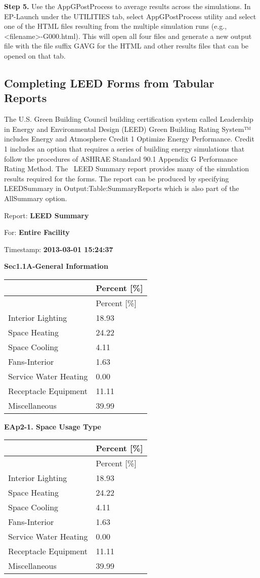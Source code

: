 \textbf{Step 5.} Use the AppGPostProcess to average results across the simulations. In EP-Launch under the UTILITIES tab, select AppGPostProcess utility and select one of the HTML files resulting from the multiple simulation runs (e.g., \textless{}filename\textgreater{}-G000.html). This will open all four files and generate a new output file with the file suffix GAVG for the HTML and other results files that can be opened on that tab.

\subsection{Completing LEED Forms from Tabular Reports}\label{completing-leed-forms-from-tabular-reports}

The U.S. Green Building Council building certification system called Leadership in Energy and Environmental Design (LEED) Green Building Rating System™ includes Energy and Atmosphere Credit 1 Optimize Energy Performance. Credit 1 includes an option that requires a series of building energy simulations that follow the procedures of ASHRAE Standard 90.1 Appendix G Performance Rating Method. The~ LEED Summary report provides many of the simulation results required for the forms. The report can be produced by specifying LEEDSummary in Output:Table:SummaryReports which is also part of the AllSummary option.

Report: \textbf{LEED Summary}

For: \textbf{Entire Facility}

Timestamp: \textbf{2013-03-01 15:24:37}

\textbf{Sec1.1A-General Information}

\begin{longtable}[c]{@{}ll@{}}
\toprule 
 & Percent [\%] \tabularnewline
\midrule
\endfirsthead

\toprule 
 & Percent [\%] \tabularnewline
\midrule
\endhead

Interior Lighting & 18.93 \tabularnewline
Space Heating & 24.22 \tabularnewline
Space Cooling & 4.11 \tabularnewline
Fans-Interior & 1.63 \tabularnewline
Service Water Heating & 0.00 \tabularnewline
Receptacle Equipment & 11.11 \tabularnewline
Miscellaneous & 39.99 \tabularnewline
\bottomrule
\end{longtable}

\textbf{EAp2-1. Space Usage Type}

\begin{longtable}[c]{@{}ll@{}}
\toprule 
 & Percent [\%] \tabularnewline
\midrule
\endfirsthead

\toprule 
 & Percent [\%] \tabularnewline
\midrule
\endhead

Interior Lighting & 18.93 \tabularnewline
Space Heating & 24.22 \tabularnewline
Space Cooling & 4.11 \tabularnewline
Fans-Interior & 1.63 \tabularnewline
Service Water Heating & 0.00 \tabularnewline
Receptacle Equipment & 11.11 \tabularnewline
Miscellaneous & 39.99 \tabularnewline
\bottomrule
\end{longtable}

